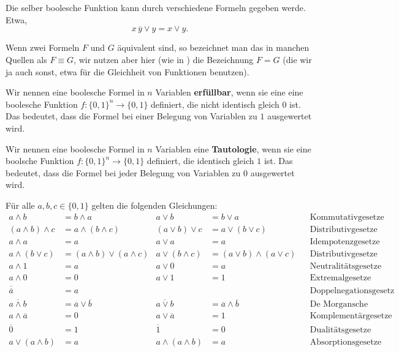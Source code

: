 \begin{defn}
	Die selber boolesche Funktion kann durch verschiedene Formeln gegeben werde. Etwa, 
	\[
		x \, \overline{y}\vee y= x \vee y.  
	\]
\end{defn} 

\begin{bem}
	Wenn zwei Formeln $F$ und $G$ äquivalent sind, so bezeichnet man das in manchen Quellen als $F \equiv G$, wir nutzen aber hier (wie in \cite{Lov20}) die Bezeichnung $F = G$ (die wir ja auch sonst, etwa für die  Gleichheit von Funktionen benutzen). 
\end{bem} 

\begin{defn} 
Wir nennen eine boolesche Formel in $n$ Variablen \textbf{erfüllbar}, wenn sie eine eine boolesche Funktion $f  : \{0,1\}^n \to \{0,1\}$ definiert, die nicht identisch gleich $0$ ist. Das bedeutet, dass die Formel bei einer Belegung von Variablen zu $1$ ausgewertet wird. 
\end{defn} 

\begin{defn} 
Wir nennen eine boolesche Formel in $n$ Variablen eine \textbf{Tautologie}, wenn sie eine boolsche Funktion $f: \{0,1\}^n \to \{0,1\}$ definiert, die identisch gleich $1$ ist. Das bedeutet, dass die Formel bei jeder Belegung von Variablen zu $0$ ausgewertet wird. 
\end{defn} 


\begin{prop}
	Für alle $a,b,c \in \{0,1\}$ gelten die folgenden Gleichungen: 
	\footnotesize
		\begin{align*}
			a \wedge b & = b \wedge a &  a \vee b & = b \vee a & & \text{Kommutativgesetze} 
			\\ (a \wedge b) \wedge c & = a \wedge (b \wedge c) &  (a \vee b) \vee c& = a \vee (b \vee c) & & \text{Distributivgesetze} 
			\\ a \wedge a & = a  & a \vee a & = a  & & \text{Idempotenzgesetze} 
			\\ a \wedge (b \vee c) & = (a \wedge b) \vee (a \wedge c) &  a \vee (b \wedge c) & = (a \vee b) \wedge (a \vee c)  && \text{Distributivgesetze} 
			\\ a \wedge 1 & = a  & a \vee 0 & = a  & & \text{Neutralitätsgesetze} 
			\\ a \wedge 0 & = 0 &  a \vee 1 & = 1 & & \text{Extremalgesetze} 
			\\ \overline{\overline{a}} & = a & & & & \text{Doppelnegationsgesetz}			
			\\ \overline{a \wedge b} & = \overline{a} \vee \overline{b}  & \overline{a \vee b} & = \overline{a} \wedge \overline{b} & & \text{De Morgansche Gesetze} 
			\\ a \wedge \overline{a} & = 0  & a \vee \overline{a} & = 1 & & \text{Komplementärgesetze}
			\\ \overline{0} & = 1 & \overline{1} & = 0 & & \text{Dualitätsgesetze} 
			\\ a \vee (a \wedge b) & = a & a \wedge (a \wedge b) & = a & & \text{Absorptionsgesetze}
		\end{align*} 
\end{prop} 





